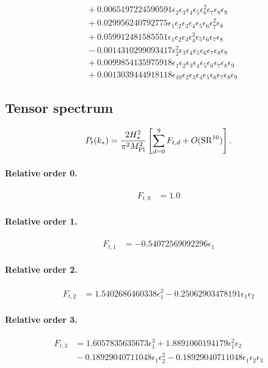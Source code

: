 \documentclass[10pt]{article}
\begin{document}
\begin{align*}
&{}  + 0.0065197224590591 \epsilon_{2} \epsilon_{3} \epsilon_{4} \epsilon_{5} \epsilon_{6}^{2} \epsilon_{7} \epsilon_{8} \epsilon_{9} \\
&{}  + 0.029956240792775 \epsilon_{1} \epsilon_{2} \epsilon_{3} \epsilon_{4} \epsilon_{5} \epsilon_{6} \epsilon_{7}^{2} \epsilon_{8} \\
&{}  + 0.059912481585551 \epsilon_{1} \epsilon_{2} \epsilon_{3} \epsilon_{4}^{2} \epsilon_{5} \epsilon_{6} \epsilon_{7} \epsilon_{8} \\
&{}  - 0.0014310299093417 \epsilon_{2}^{2} \epsilon_{3} \epsilon_{4} \epsilon_{5} \epsilon_{6} \epsilon_{7} \epsilon_{8} \epsilon_{9} \\
&{}  + 0.0099854135975918 \epsilon_{1} \epsilon_{2} \epsilon_{3} \epsilon_{4} \epsilon_{5} \epsilon_{6} \epsilon_{7} \epsilon_{8} \epsilon_{9} \\
&{}  + 0.0013039444918118 \epsilon_{10} \epsilon_{2} \epsilon_{3} \epsilon_{4} \epsilon_{5} \epsilon_{6} \epsilon_{7} \epsilon_{8} \epsilon_{9}
\end{align*}

\subsection{Tensor spectrum}
\[P_t(k_*)=\frac{2H_*^2}{\pi^2M_{\rm Pl}^2}\left[\sum_{d=0}^{9}F_{t,d}+O(\mathrm{SR}^{10})\right].\]
\paragraph{Relative order 0.}
\begin{align*}
F_{t,0} &= 1.0
\end{align*}

\paragraph{Relative order 1.}
\begin{align*}
F_{t,1} &=  - 0.54072569092296 \epsilon_{1}
\end{align*}

\paragraph{Relative order 2.}
\begin{align*}
F_{t,2} &= 1.5402686460338 \epsilon_{1}^{2} - 0.25062903478191 \epsilon_{1} \epsilon_{2}
\end{align*}

\paragraph{Relative order 3.}
\begin{align*}
F_{t,3} &= 1.6057835635673 \epsilon_{1}^{3} + 1.8891060194179 \epsilon_{1}^{2} \epsilon_{2} \\
&{}  - 0.18929040711048 \epsilon_{1} \epsilon_{2}^{2} - 0.18929040711048 \epsilon_{1} \epsilon_{2} \epsilon_{3}
\end{align*}
\end{document}
